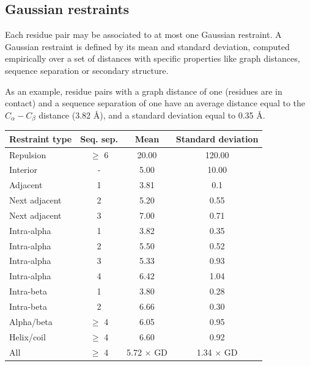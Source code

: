     \subsection{Gaussian restraints}

        Each residue pair may be associated to at most one Gaussian restraint.
        A Gaussian restraint is defined by its mean and standard deviation,
        computed empirically over a set of distances with specific properties
        like graph distances, sequence separation or secondary structure.

        As an example, residue pairs with a graph distance of one (residues are
        in contact) and a sequence separation of one have an average distance equal
        to the $C_{\alpha}-C_{\beta}$ distance (3.82 \AA{}), and a standard deviation
        equal to 0.35 \AA{}.

        \begin{table}[H]
            \centering
            \begin{tabular}{|l|c|c|c|}
                \hline
                Restraint type & Seq. sep. & Mean & Standard deviation \\
                \hline
                \hline
                Repulsion     & $\ge$ 6 & 20.00 & 120.00 \\
                Interior      & - & 5.00 & 10.00 \\
                Adjacent      & 1 & 3.81 & 0.1  \\
                Next adjacent & 2 & 5.20 & 0.55 \\
                Next adjacent & 3 & 7.00 & 0.71 \\
                Intra-alpha   & 1 & 3.82 & 0.35 \\
                Intra-alpha   & 2 & 5.50 & 0.52 \\
                Intra-alpha   & 3 & 5.33 & 0.93 \\
                Intra-alpha   & 4 & 6.42 & 1.04 \\
                Intra-beta    & 1 & 3.80 & 0.28 \\
                Intra-beta    & 2 & 6.66 & 0.30 \\
                Alpha/beta    & $\ge$ 4 & 6.05 & 0.95 \\
                Helix/coil    & $\ge$ 4 & 6.60 & 0.92 \\
                All & $\ge$ 4 & 5.72 $\times$ GD & 1.34 $\times$ GD \\
                \hline
            \end{tabular}
            \label{restraints}
        \end{table}

